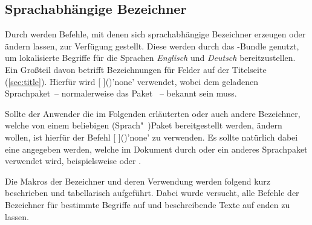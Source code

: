 \begin{Declaration*}{}
\begin{Declaration*}{}
\begin{Declaration*}{}
\section{Sprachabhängige Bezeichner}
%
%
%
%
Durch \KOMAScript{} werden Befehle, mit denen sich sprachabhängige Bezeichner 
erzeugen oder ändern lassen, zur Verfügung gestellt. Diese werden durch das
\TUDScript-Bundle genutzt, um lokalisierte Begriffe für die Sprachen 
\emph{Englisch} und \emph{Deutsch} bereitzustellen. Ein Großteil davon betrifft 
Bezeichnungen für Felder auf der Titelseite (\autoref{sec:title}). Hierfür wird
[%
]()'none'
verwendet, wobei  dem geladenen Sprachpaket~-- normalerweise das 
Paket ~-- bekannt sein muss.

Sollte der Anwender die im Folgenden erläuterten oder auch andere Bezeichner, 
welche von einem beliebigen (Sprach"~)Paket bereitgestellt werden, ändern 
wollen, ist hierfür der Befehl
[%
]()'none'
zu verwenden. Es sollte natürlich dabei eine  angegeben werden, 
welche im Dokument durch  oder ein anderes Sprachpaket verwendet 
wird, beispielsweise  oder . 

Die Makros der Bezeichner und deren Verwendung werden folgend kurz beschrieben 
und tabellarisch aufgeführt. Dabei wurde versucht, alle Befehle der Bezeichner 
für bestimmte Begriffe auf  und beschreibende 
Texte auf  enden zu lassen.


\end{Declaration*}
\end{Declaration*}
\end{Declaration*}
